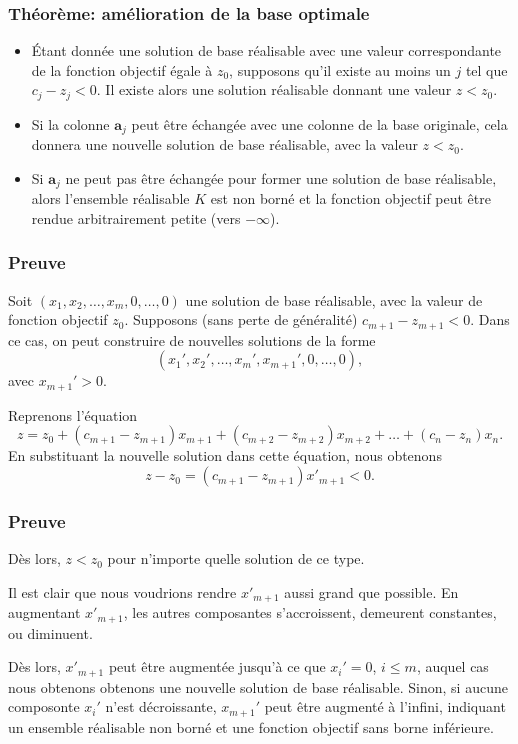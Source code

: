\documentclass[t,usepdftitle=false]{beamer}
\def\ba{\boldsymbol{a}}
\begin{document}
\begin{frame}
\frametitle{Théorème: amélioration de la base optimale}

\begin{itemize}
\item
\'Etant donnée une solution de base réalisable avec une valeur correspondante de la fonction objectif égale à $z_0$, supposons qu'il existe au moins un $j$ tel que $c_j - z_j < 0$.
Il existe alors une solution réalisable donnant une valeur $z < z_0$.
\item
Si la colonne $\ba_j$ peut être échangée avec une colonne de la base originale, cela donnera une nouvelle solution de base réalisable, avec la valeur $z < z_0$.
\item
Si $\ba_j$ ne peut pas être échangée pour former une solution de base réalisable, alors l'ensemble réalisable $K$ est non borné et la fonction objectif peut être rendue arbitrairement petite (vers $-\infty$).
\end{itemize}

\end{frame}

\begin{frame}
\frametitle{Preuve}

Soit $(x_1, x_2,\ldots, x_m, 0,\ldots,0)$ une solution de base réalisable, avec la valeur de fonction objectif $z_0$. Supposons (sans perte de généralité) $c_{m+1} - z_{m+1} < 0$. Dans ce cas, on peut construire de nouvelles solutions de la forme
\[
(x_1', x_2', \ldots, x_m', x_{m+1}', 0, \ldots, 0),
\]
avec $x_{m+1}' > 0$.

\mbox{}

Reprenons l'équation
\[
z = z_0 + (c_{m+1} - z_{m+1})x_{m+1}
+ (c_{m+2} - z_{m+2})x_{m+2} + \ldots
+ (c_{n} - z_n) x_{n}.
\]
En substituant la nouvelle solution dans cette équation, nous obtenons
\[
z - z_0 = (c_{m+1} - z_{m+1})x'_{m+1} < 0.
\]

\end{frame}

\begin{frame}
\frametitle{Preuve}

Dès lors, $z < z_0$ pour n'importe quelle solution de ce type.

\mbox{}

Il est clair que nous voudrions rendre $x'_{m+1}$ aussi grand que possible. En augmentant $x'_{m+1}$, les autres composantes s'accroissent, demeurent constantes, ou diminuent.

\mbox{}

Dès lors, $x'_{m+1}$ peut être augmentée jusqu'à ce que $x_i' = 0$, $i \leq m$, auquel cas nous obtenons obtenons une nouvelle solution de base réalisable. Sinon, si aucune composonte $x_i'$ n'est décroissante, $x_{m+1}'$ peut être augmenté à l'infini, indiquant un ensemble réalisable non borné et une fonction objectif sans borne inférieure.
\end{frame}
\end{document}
